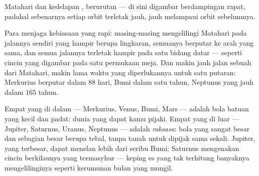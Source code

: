 \begin{omfigure}

{\small Matahari dan kedelapan , berurutan --- di sini
digambar berdampingan rapat, padahal sebenarnya setiap orbit terletak
jauh, jauh melampaui orbit sebelumnya.}
\end{omfigure}

\begin{proposition}\label{prop:g4:solar-system:habits}
Para  menjaga kebiasaan yang rapi: masing-masing mengelilingi
Matahari pada jalannya sendiri yang hampir berupa lingkaran, semuanya
berputar ke arah yang sama, dan semua jalannya terletak hampir pada
satu bidang datar --- seperti cincin yang digambar pada satu permukaan
meja. Dan makin jauh jalan sebuah  dari Matahari, makin lama
waktu yang diperlukannya untuk satu putaran: Merkurius berputar dalam
$88$ hari, Bumi dalam satu tahun, Neptunus yang jauh dalam $165$
tahun.
\end{proposition}

\begin{example}\label{ex:g4:solar-system:kinds}
Empat  yang di dalam --- Merkurius, Venus, Bumi, Mars --- adalah
bola batuan yang kecil dan padat: dunia yang dapat kamu pijaki. Empat
yang di luar --- Jupiter, Saturnus, Uranus, Neptunus --- adalah
\emph{raksasa}: bola yang sangat besar dan sebagian besar berupa 
tebal, tanpa tanah untuk dipijak sama sekali. Jupiter, yang terbesar,
dapat menelan lebih dari seribu Bumi; Saturnus mengenakan cincin
berkilaunya yang termasyhur --- keping es yang tak terhitung banyaknya
mengelilinginya seperti kerumunan bulan yang mungil.
\end{example}

